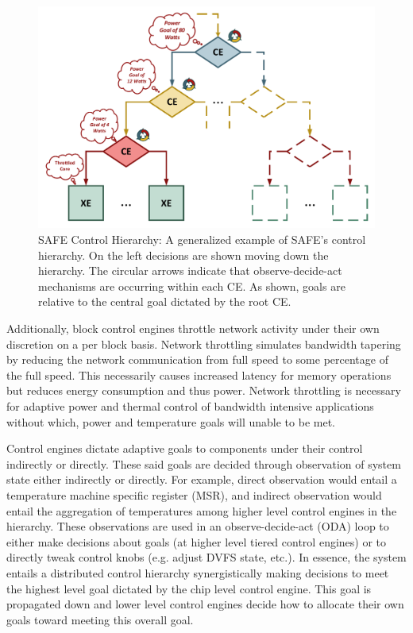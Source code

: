     \begin{figure}[htb!]
        \centering
        \includegraphics[width=1.0\textwidth]{Fig/Control_Hierarchy.pdf}
        \caption[SAFE Control Hierarchy]{SAFE Control Hierarchy: A generalized example of SAFE's control hierarchy. On the left decisions are shown moving down the hierarchy. The circular arrows indicate that observe-decide-act mechanisms are occurring within each CE. As shown, goals are relative to the central goal dictated by the root CE.}
        \label{fig:Control-Hierarchy}
    \end{figure}

    Additionally, block control engines throttle network activity under their own discretion on a per block basis. Network throttling simulates bandwidth tapering by reducing the network communication from full speed to some percentage of the full speed. This necessarily causes increased latency for memory operations but reduces energy consumption and thus power. Network throttling is necessary for adaptive power and thermal control of bandwidth intensive applications without which, power and temperature goals will unable to be met.

    Control engines dictate adaptive goals to components under their control indirectly or directly. These said goals are decided through observation of system state either indirectly or directly. For example, direct observation would entail a temperature machine specific register (MSR), and indirect observation would entail the aggregation of temperatures among higher level control engines in the hierarchy. These observations are used in an observe-decide-act (ODA) loop to either make decisions about goals (at higher level tiered control engines) or to directly tweak control knobs (e.g. adjust DVFS state, etc.). In essence, the system entails a distributed control hierarchy synergistically making decisions to meet the highest level goal dictated by the chip level control engine. This goal is propagated down and lower level control engines decide how to allocate their own goals toward meeting this overall goal. 

